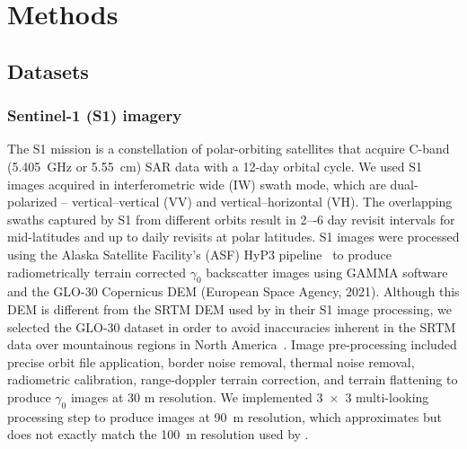 \documentclass[journal abbreviation, manuscript]{copernicus}
\begin{document}
\section{Methods}

\subsection{Datasets}

\subsubsection{Sentinel-1 (S1) imagery}\label{sec:s1_processing}

The S1 mission is a constellation of polar-orbiting satellites that acquire C-band (5.405~GHz or 5.55~cm) SAR data with a 12-day orbital cycle. We used S1 images acquired in interferometric wide (IW) swath mode, which are dual-polarized -- vertical–vertical (VV) and vertical–horizontal (VH). The overlapping swaths captured by S1 from different orbits result in 2–-6 day revisit intervals for mid-latitudes and up to daily revisits at polar latitudes.  S1 images were processed using the Alaska Satellite Facility’s (ASF) HyP3 pipeline~\citep{Hogenson.2020} to produce radiometrically terrain corrected $\gamma_0$ backscatter images using GAMMA software~\citep{Frerebeau.2023, Lebrun.2020} and the GLO-30 Copernicus DEM (European Space Agency, 2021)\nocite{Agency.2021}. Although this DEM is different from the SRTM DEM used by \citet{Lievens.2019, Lievens.2022} in their S1 image processing, we selected the GLO-30 dataset in order to avoid inaccuracies inherent in the SRTM data over mountainous regions in North America~\citep{Tarricone.2023}. Image pre-processing included precise orbit file application, border noise removal, thermal noise removal, radiometric calibration, range-doppler terrain correction, and terrain flattening to produce $\gamma_0$ images at 30 m resolution. We implemented 3~$\times$~3 multi-looking processing step to produce images at 90~m resolution, which approximates but does not exactly match the 100~m resolution used by \citet{Lievens.2022}. 
\end{document}
